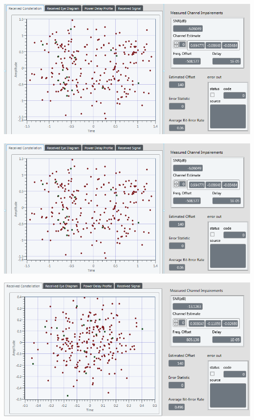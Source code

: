 \documentclass[frenchb, oneside, headings=normal]{scrartcl}
\begin{document}
    \begin{minipage}[b]{0.48\linewidth}
         \centering \includegraphics[scale=0.55]{img/Sliding_correletaion_OFF_AWGN_5dB_shift_bit_0.png}
    \end{minipage}
    
    \begin{minipage}[b]{0.48\linewidth}
        \centering \includegraphics[scale=0.55]{img/Sliding_correletaion_OFF_AWGN_5dB_shift_bit_0.png}
    
    \end{minipage}\hfill
    \begin{minipage}[b]{0.48\linewidth}
         \centering \includegraphics[scale=0.6]{img/Sliding_correletaion_OFF_AWGN_5dB_shift_bit_5.PNG}
    \end{minipage}
\end{document}
